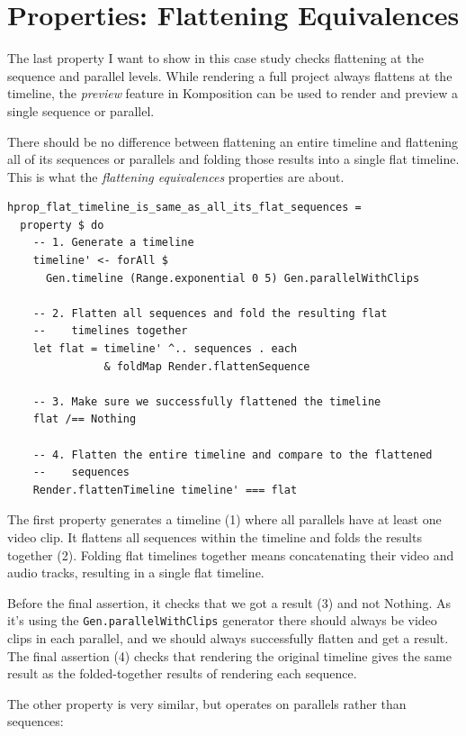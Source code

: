\section{Properties: Flattening Equivalences}

The last property I want to show in this case study checks flattening at the sequence and parallel levels. While rendering a full project always flattens at the timeline, the \textit{preview} feature in Komposition can be used to render and preview a single sequence or parallel.

There should be no difference between flattening an entire timeline and flattening all of its sequences or parallels and folding those results into a single flat timeline. This is what the \textit{flattening equivalences} properties are about.

\begin{verbatim}
hprop_flat_timeline_is_same_as_all_its_flat_sequences =
  property $ do
    -- 1. Generate a timeline
    timeline' <- forAll $
      Gen.timeline (Range.exponential 0 5) Gen.parallelWithClips
  
    -- 2. Flatten all sequences and fold the resulting flat
    --    timelines together
    let flat = timeline' ^.. sequences . each
               & foldMap Render.flattenSequence
  
    -- 3. Make sure we successfully flattened the timeline
    flat /== Nothing
               
    -- 4. Flatten the entire timeline and compare to the flattened 
    --    sequences
    Render.flattenTimeline timeline' === flat
\end{verbatim}
The first property generates a timeline (1) where all parallels have at least one video clip. It flattens all sequences within the timeline and folds the results together (2). Folding flat timelines together means concatenating their video and audio tracks, resulting in a single flat timeline.

Before the final assertion, it checks that we got a result (3) and not Nothing. As it's using the \texttt{Gen.parallelWithClips} generator there should always be video clips in each parallel, and we should always successfully flatten and get a result. The final assertion (4) checks that rendering the original timeline gives the same result as the folded-together results of rendering each sequence.

The other property is very similar, but operates on parallels rather than sequences:

